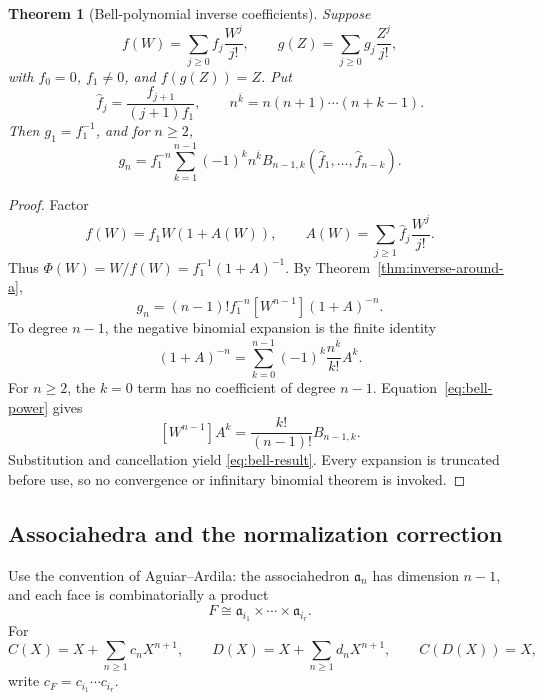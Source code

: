 \documentclass[11pt]{article}
\newtheorem{theorem}{Theorem}[section]
\theoremstyle{definition}
\begin{document}
\begin{theorem}[Bell-polynomial inverse coefficients]\label{thm:bell}
Suppose
\[
 f(W)=\sum_{j\ge0}f_j\frac{W^j}{j!},\qquad
 g(Z)=\sum_{j\ge0}g_j\frac{Z^j}{j!},
\]
with \(f_0=0\), \(f_1\ne0\), and \(f(g(Z))=Z\).  Put
\[
 \widehat f_j=\frac{f_{j+1}}{(j+1)f_1},
 \qquad n^{\overline{k}}=n(n+1)\cdots(n+k-1).
\]
Then \(g_1=f_1^{-1}\), and for \(n\ge2\),
\begin{equation}\label{eq:bell-result}
 g_n=f_1^{-n}\sum_{k=1}^{n-1}(-1)^k n^{\overline{k}}
 B_{n-1,k}(\widehat f_1,\ldots,\widehat f_{n-k}).
\end{equation}
\end{theorem}
\begin{proof}
Factor
\[
 f(W)=f_1W(1+A(W)),\qquad
 A(W)=\sum_{j\ge1}\widehat f_j\frac{W^j}{j!}.
\]
Thus \(\Phi(W)=W/f(W)=f_1^{-1}(1+A)^{-1}\).  By
Theorem~\ref{thm:inverse-around-a},
\[
 g_n=(n-1)!f_1^{-n}[W^{n-1}](1+A)^{-n}.
\]
To degree \(n-1\), the negative binomial expansion is the finite identity
\[
 (1+A)^{-n}
 =\sum_{k=0}^{n-1}(-1)^k\frac{n^{\overline{k}}}{k!}A^k.
\]
For \(n\ge2\), the \(k=0\) term has no coefficient of degree \(n-1\).
Equation~\eqref{eq:bell-power} gives
\[
 [W^{n-1}]A^k=\frac{k!}{(n-1)!}B_{n-1,k}.
\]
Substitution and cancellation yield \eqref{eq:bell-result}.  Every expansion is
truncated before use, so no convergence or infinitary binomial theorem is
invoked.
\end{proof}

\subsection{Associahedra and the normalization correction}\label{sec:assoc}

Use the convention of Aguiar--Ardila: the associahedron \(\mathfrak a_n\) has
dimension \(n-1\), and each face is combinatorially a product
\[
 F\cong \mathfrak a_{i_1}\times\cdots\times\mathfrak a_{i_r}.
\]
For
\[
 C(X)=X+\sum_{n\ge1}c_nX^{n+1},\qquad
 D(X)=X+\sum_{n\ge1}d_nX^{n+1},
 \qquad C(D(X))=X,
\]
write \(c_F=c_{i_1}\cdots c_{i_r}\).
\end{document}
